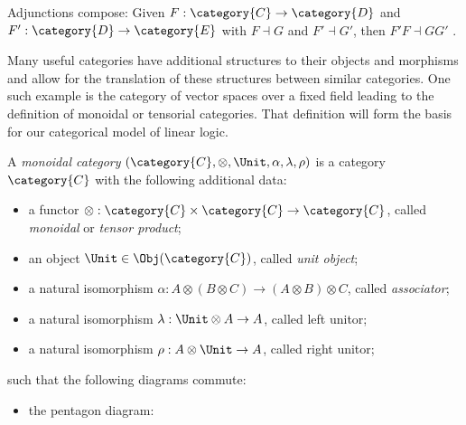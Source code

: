 \documentclass[DIN, pagenumber=false, fontsize=11pt, parskip=half, colorinlistoftodos, svgnames]{scrartcl}
\begin{document}
	\begin{lemma}
		\label{lemma: compAdjunction}
		Adjunctions compose: Given $F: \category{C} \rightarrow \category{D}$ and $F': \category{D} \rightarrow \category{E}$ with $F\dashv G$ and $F' \dashv G'$, then $F'F \dashv GG'$ \cite[Prop. 4.4.4]{riehl_context}.
	\end{lemma}
	
	Many useful categories have additional structures to their objects and morphisms and allow for the translation of these structures between similar categories. One such example is the category of vector spaces over a fixed field leading to the definition of monoidal or tensorial categories. That definition will form the basis for our categorical model of linear logic.
	
	
	\begin{definition}
		\label{def: monoCat}
		A \emph{monoidal category} $(\category{C}, \otimes, \Unit, \alpha, \lambda, \rho)$ is a category $\category{C}$ with the following additional data:
		\begin{itemize}
			\item 
				a functor $\otimes : \category{C} \times \category{C} \rightarrow \category{C} $, called \emph{monoidal} or \emph{tensor product};
			\item 
				an object $\Unit \in  \Obj(\category{C})$, called \emph{unit object};
			\item 
				a natural isomorphism $\alpha: A \otimes (B \otimes C ) \rightarrow (A \otimes B) \otimes C$, called \emph{associator};
			\item 
				a natural isomorphism $\lambda: \Unit \otimes A \rightarrow A$, called left unitor;
			\item 
				a natural isomorphism $\rho: A \otimes \Unit \rightarrow A$, called right unitor;
		\end{itemize}
		such that the following diagrams commute:
		\begin{itemize}
			\item the pentagon diagram: 
			\begin{center}
			\end{center}
			

\end{itemize}
\end{definition}
\end{document}
